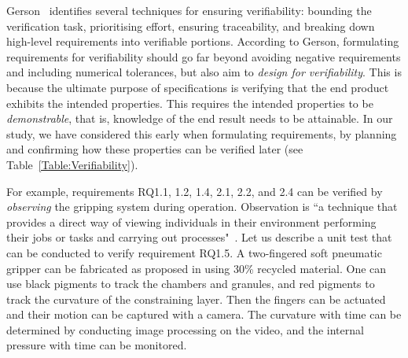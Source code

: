 \documentclass[lettersize,journal]{IEEEtran}
\begin{document}
Gerson~\cite{Gerson1993} identifies several techniques for ensuring verifiability: bounding the verification task, prioritising effort, ensuring traceability, and breaking down high-level requirements into verifiable portions. 
According to Gerson, formulating requirements for verifiability should go far beyond avoiding negative requirements and including numerical tolerances, but also aim to \emph{design for verifiability}. 
This is because the ultimate purpose of specifications is verifying that the end product exhibits the intended properties. 
This requires the intended properties to be \emph{demonstrable}, that is, knowledge of the end result needs to be attainable. 
In our study, we have considered this early when formulating requirements, by planning and confirming how these properties can be verified later (see Table~\ref{Table:Verifiability}). 

For example, requirements RQ1.1, 1.2, 1.4, 2.1, 2.2, and 2.4 can be verified by \emph{observing} the gripping system during operation. 
Observation is ``a technique that provides a direct way of viewing individuals in their environment performing their jobs or tasks and carrying out processes"~\cite{ISO24765:2017}.
Let us describe a unit test that can be conducted to verify requirement RQ1.5. 
A two-fingered soft pneumatic gripper can be fabricated as proposed in \cite{Partridge2022} using 30\% recycled material. 
One can use black pigments to track the chambers and granules, and red pigments to track the curvature of the constraining layer. 
Then the fingers can be actuated and their motion can be captured with a camera. 
The curvature with time can be determined by conducting image processing on the video, and the internal pressure with time can be monitored.

%
\end{document}
